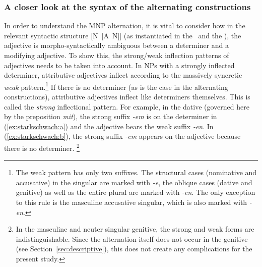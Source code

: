 \subsubsection{A closer look at the syntax of the alternating constructions}
\label{sec:syntax}

In order to understand the MNP alternation, it is vital to consider how in the relevant syntactic structure [N~[A~N]] (as instantiated in the \NACa\ and the \PGCa), the adjective is morpho-syntactically ambiguous between a determiner and a modifying adjective.
To show this, the strong\slash weak inflection patterns of adjectives needs to be taken into account.
In NPs with a strongly inflected determiner, attributive adjectives inflect according to the massively syncretic \textit{weak} pattern.\footnote{The weak pattern has only two suffixes.
The structural cases (nominative and accusative) in the singular are marked with \textit{-e}, the oblique cases (dative and genitive) as well as the entire plural are marked with \textit{-en}.
The only exception to this rule is the masculine accusative singular, which is also marked with \textit{-en}.}
If there is no determiner (as is the case in the alternating constructions), attributive adjectives inflect like determiners themselves.
This is called the \textit{strong} inflectional pattern.
For example, in the dative (governed here by the preposition \textit{mit}), the strong suffix \textit{-em} is on the determiner in (\ref{ex:starkschwach:a}) and the adjective bears the weak suffix \textit{-en}. 
In (\ref{ex:starkschwach:b}), the strong suffix \textit{-em} appears on the adjective because there is no determiner.%
\footnote{In the masculine and neuter singular genitive, the strong and weak forms are indistinguishable.
Since the alternation itself does not occur in the genitive (see Section~\ref{sec:descriptive}), this does not create any complications for the present study.}

\begin{exe}
  \ex\label{ex:starkschwach} 
  \begin{xlist}
  \end{xlist}
\end{exe}

